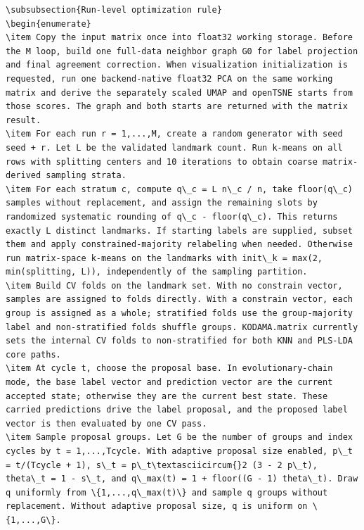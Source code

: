 \documentclass[twoside,11pt]{article}
\begin{document}
\begin{small}
\begin{verbatim}
\subsubsection{Run-level optimization rule}
\begin{enumerate}
\item Copy the input matrix once into float32 working storage. Before the M loop, build one full-data neighbor graph G0 for label projection and final agreement correction. When visualization initialization is requested, run one backend-native float32 PCA on the same working matrix and derive the separately scaled UMAP and openTSNE starts from those scores. The graph and both starts are returned with the matrix result.
\item For each run r = 1,...,M, create a random generator with seed seed + r. Let L be the validated landmark count. Run k-means on all rows with splitting centers and 10 iterations to obtain coarse matrix-derived sampling strata.
\item For each stratum c, compute q\_c = L n\_c / n, take floor(q\_c) samples without replacement, and assign the remaining slots by randomized systematic rounding of q\_c - floor(q\_c). This returns exactly L distinct landmarks. If starting labels are supplied, subset them and apply constrained-majority relabeling when needed. Otherwise run matrix-space k-means on the landmarks with init\_k = max(2, min(splitting, L)), independently of the sampling partition.
\item Build CV folds on the landmark set. With no constrain vector, samples are assigned to folds directly. With a constrain vector, each group is assigned as a whole; stratified folds use the group-majority label and non-stratified folds shuffle groups. KODAMA.matrix currently sets the internal CV folds to non-stratified for both KNN and PLS-LDA core paths.
\item At cycle t, choose the proposal base. In evolutionary-chain mode, the base label vector and prediction vector are the current accepted state; otherwise they are the current best state. These carried predictions drive the label proposal, and the proposed label vector is then evaluated by one CV pass.
\item Sample proposal groups. Let G be the number of groups and index cycles by t = 1,...,Tcycle. With adaptive proposal size enabled, p\_t = t/(Tcycle + 1), s\_t = p\_t\textasciicircum{}2 (3 - 2 p\_t), theta\_t = 1 - s\_t, and q\_max(t) = 1 + floor((G - 1) theta\_t). Draw q uniformly from \{1,...,q\_max(t)\} and sample q groups without replacement. Without adaptive proposal size, q is uniform on \{1,...,G\}.

\end{verbatim}
\end{small}
\end{document}
